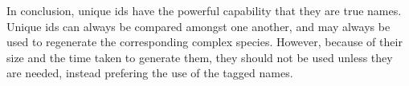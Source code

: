 In conclusion, unique ids have the powerful capability that they are
true names.  Unique ids can always be compared amongst one another,
and may always be used to regenerate the corresponding complex
species.  However, because of their size and the time taken to
generate them, they should not be used unless they are needed, instead
prefering the use of the tagged names.  
